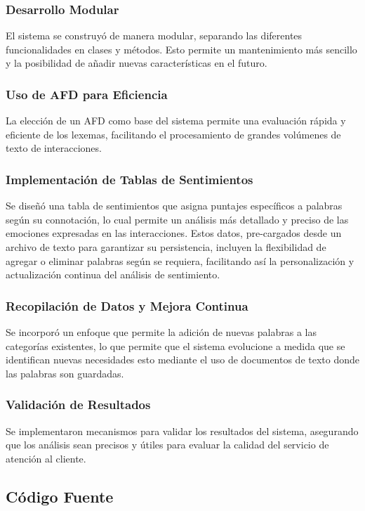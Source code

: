 \documentclass[12pt,a4paper]{scrartcl} %
\begin{document}
\subsubsection{Desarrollo Modular}
El sistema se construyó de manera modular, separando las diferentes funcionalidades en clases y
métodos. Esto permite un mantenimiento más sencillo y la posibilidad de añadir nuevas
características en el futuro.

\subsubsection{Uso de AFD para Eficiencia}
La elección de un AFD como base del sistema permite una evaluación rápida y eficiente de los
lexemas, facilitando el procesamiento de grandes volúmenes de texto de interacciones.

\subsubsection{Implementación de Tablas de Sentimientos}
Se diseñó una tabla de sentimientos que asigna puntajes específicos a palabras según su
connotación, lo cual permite un análisis más detallado y preciso de las emociones expresadas en
las interacciones. Estos datos, pre-cargados desde un archivo de texto para garantizar su
persistencia, incluyen la flexibilidad de agregar o eliminar palabras según se requiera,
facilitando así la personalización y actualización continua del análisis de sentimiento.

\subsubsection{Recopilación de Datos y Mejora Continua}
Se incorporó un enfoque que permite la adición de nuevas palabras a las categorías existentes,
lo que permite que el sistema evolucione a medida que se identifican nuevas necesidades esto
mediante el uso de documentos de texto donde las palabras son guardadas.

\subsubsection{Validación de Resultados}
Se implementaron mecanismos para validar los resultados del sistema, asegurando que los
análisis sean precisos y útiles para evaluar la calidad del servicio de atención al cliente.

\newpage
\subsection{Código Fuente}
\end{document}
